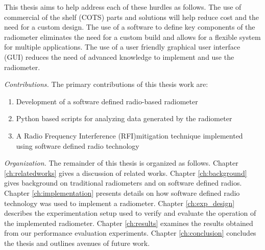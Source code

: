 This thesis aims to help address each of these hurdles as follows.  The use of commercial of the shelf (COTS) parts and solutions will help reduce cost and the need for a custom design.  The use of a software to define key components of the radiometer eliminates the need for a custom build and allows for a flexible system for multiple applications.  The use of a user friendly graphical user interface (GUI) reduces the need of advanced knowledge to implement and use the radiometer. 


\emph{Contributions.}  The primary contributions of this thesis work are:

\begin{enumerate}
\item Development of a software defined radio-based radiometer
\item Python based scripts for analyzing data generated by the radiometer
\item A Radio Frequency Interference (RFI)mitigation technique implemented using software defined radio technology
\end{enumerate}

\emph{Organization.}  The remainder of this thesis is organized as follows.  Chapter \ref{ch:relatedworks} gives a discussion of related works.  Chapter \ref{ch:background} gives background on traditional radiometers and on software defined radios.  Chapter \ref{ch:implementation} presents details on how software defined radio technology was used to implement a radiometer.  Chapter \ref{ch:exp_design} describes the experimentation setup used to verify and evaluate the operation of the implemented radiometer.  Chapter \ref{ch:results} examines the results obtained from our performance evaluation experiments.  Chapter \ref{ch:conclusion} concludes the thesis and outlines avenues of future work.

